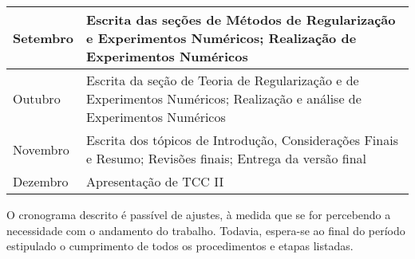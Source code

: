 \begin{table}[htb]
\begin{center}
\begin{tabular}{ | m{} | m{} | }
\hline
 Setembro & 
    Escrita das seções de Métodos de Regularização e Experimentos Numéricos; Realização de Experimentos Numéricos \\

\hline
 Outubro & 
    Escrita da seção de Teoria de Regularização e de Experimentos Numéricos; Realização e análise de Experimentos Numéricos \\

\hline
 Novembro & 
    Escrita dos tópicos de Introdução, Considerações Finais e Resumo; Revisões finais; Entrega da versão final \\

\hline
 Dezembro & 
    Apresentação de TCC II \\    
    
\hline
\end{tabular}
\end{center}
\end{table}

O cronograma descrito é passível de ajustes, à medida que se for percebendo a necessidade com o andamento do trabalho. Todavia, espera-se ao final do período estipulado o cumprimento de todos os procedimentos e etapas listadas.


